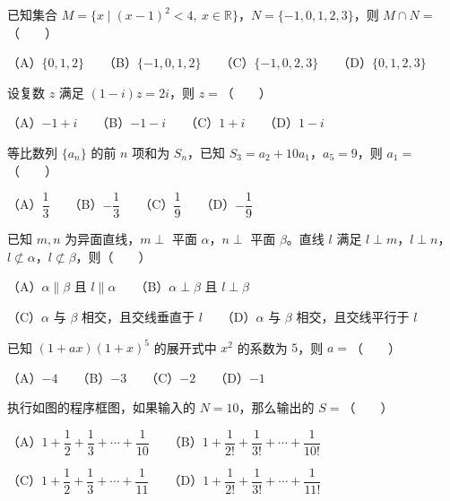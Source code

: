 \begin{question}
已知集合 $M=\{x\mid(x-1)^2<4,\ x\in\mathbb R\}$，$N=\{-1,0,1,2,3\}$，则 $M\cap N=$\mbox{（　　）}

（A）$\{0,1,2\}$　　（B）$\{-1,0,1,2\}$　　（C）$\{-1,0,2,3\}$　　（D）$\{0,1,2,3\}$

\end{question}
\begin{question}
设复数 $z$ 满足 $(1-i)z=2i$，则 $z=$\mbox{（　　）}

（A）$-1+i$　　（B）$-1-i$　　（C）$1+i$　　（D）$1-i$

\end{question}
\begin{question}
等比数列 $\{a_n\}$ 的前 $n$ 项和为 $S_n$，已知 $S_3=a_2+10a_1$，$a_5=9$，则 $a_1=$\mbox{（　　）}

（A）$\dfrac13$　　（B）$-\dfrac13$　　（C）$\dfrac19$　　（D）$-\dfrac19$

\end{question}
\begin{question}
已知 $m,n$ 为异面直线，$m\perp$ 平面 $\alpha$，$n\perp$ 平面 $\beta$。直线 $l$ 满足 $l\perp m$，$l\perp n$，$l\not\subset\alpha$，$l\not\subset\beta$，则\mbox{（　　）}

（A）$\alpha\parallel\beta$ 且 $l\parallel\alpha$　　（B）$\alpha\perp\beta$ 且 $l\perp\beta$

（C）$\alpha$ 与 $\beta$ 相交，且交线垂直于 $l$　　（D）$\alpha$ 与 $\beta$ 相交，且交线平行于 $l$

\end{question}
\begin{question}
已知 $(1+ax)(1+x)^5$ 的展开式中 $x^2$ 的系数为 $5$，则 $a=$\mbox{（　　）}

（A）$-4$　　（B）$-3$　　（C）$-2$　　（D）$-1$

\Needspace{0.4\textheight}
\end{question}
\begin{question}
执行如图的程序框图，如果输入的 $N=10$，那么输出的 $S=$\mbox{（　　）}
\nopagebreak[4]
\begin{center}\end{center}
\nopagebreak[4]
（A）$1+\dfrac12+\dfrac13+\cdots+\dfrac1{10}$　　（B）$1+\dfrac1{2!}+\dfrac1{3!}+\cdots+\dfrac1{10!}$

（C）$1+\dfrac12+\dfrac13+\cdots+\dfrac1{11}$　　（D）$1+\dfrac1{2!}+\dfrac1{3!}+\cdots+\dfrac1{11!}$

\Needspace{0.4\textheight}
\end{question}
